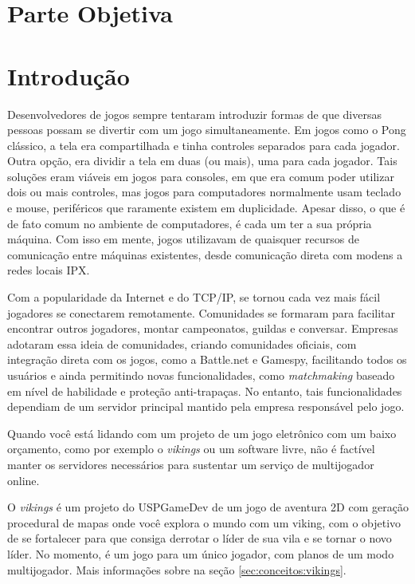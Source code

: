 \chapter*{Parte Objetiva}
\label{sec:parte_objetiva}
\chapter{Introdução}
\label{sec:intr}

Desenvolvedores de jogos sempre tentaram introduzir formas de que diversas
pessoas possam se divertir com um jogo simultaneamente. Em jogos como o Pong
clássico, a tela era compartilhada e tinha controles separados para cada 
jogador. Outra opção, era dividir a tela em duas (ou mais), uma para cada
jogador. Tais soluções eram viáveis em jogos para consoles, em que era comum
poder utilizar dois ou mais controles, mas jogos para computadores normalmente
usam teclado e mouse, periféricos que raramente existem em duplicidade.
Apesar disso, o que é de fato comum no ambiente de computadores, é cada um ter
a sua própria máquina. Com isso em mente, jogos utilizavam de quaisquer recursos
de comunicação entre máquinas existentes, desde comunicação direta com modens
a redes locais IPX.

Com a popularidade da Internet e do TCP/IP, se tornou cada vez mais fácil
jogadores se conectarem remotamente. Comunidades se formaram para facilitar
encontrar outros jogadores, montar campeonatos, guildas e conversar. Empresas
adotaram essa ideia de comunidades, criando comunidades oficiais, com integração
direta com os jogos, como a Battle.net e Gamespy, facilitando todos os usuários 
e ainda permitindo novas funcionalidades, como \textit{matchmaking} baseado em
nível de habilidade e proteção anti-trapaças. No entanto, tais funcionalidades
dependiam de um servidor principal mantido pela empresa responsável pelo jogo.

Quando você está lidando com um projeto de um jogo eletrônico com um baixo
orçamento, como por exemplo o \textit{vikings} ou um software livre, não é
factível manter os servidores necessários para sustentar um serviço de
multijogador online.

O \textit{vikings} é um projeto do USPGameDev de um jogo de aventura 2D com geração
procedural de mapas onde você explora o mundo com um viking, com o objetivo de se
fortalecer para que consiga derrotar o líder de sua vila e se tornar o novo líder.
No momento, é um jogo para um único jogador, com planos de um modo multijogador.
Mais informações sobre na seção \ref{sec:conceitos:vikings}.

